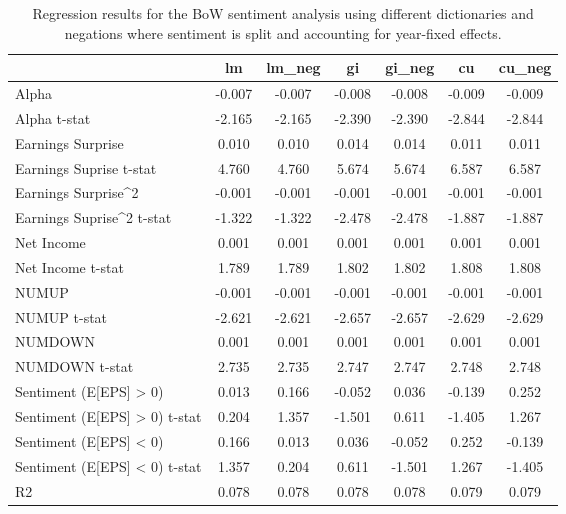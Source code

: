 \begin{table}
\caption{Regression results for the BoW sentiment analysis using different dictionaries and negations where sentiment is split and accounting for year-fixed effects.}
\label{tab:bow_regressions_split_year_fixed}
\begin{tabular}{lcccccc}
\toprule
 & lm & lm_neg & gi & gi_neg & cu & cu_neg \\
\midrule
Alpha & -0.007 & -0.007 & -0.008 & -0.008 & -0.009 & -0.009 \\
Alpha t-stat & -2.165 & -2.165 & -2.390 & -2.390 & -2.844 & -2.844 \\
Earnings Surprise & 0.010 & 0.010 & 0.014 & 0.014 & 0.011 & 0.011 \\
Earnings Suprise t-stat & 4.760 & 4.760 & 5.674 & 5.674 & 6.587 & 6.587 \\
Earnings Surprise^2 & -0.001 & -0.001 & -0.001 & -0.001 & -0.001 & -0.001 \\
Earnings Suprise^2 t-stat & -1.322 & -1.322 & -2.478 & -2.478 & -1.887 & -1.887 \\
Net Income & 0.001 & 0.001 & 0.001 & 0.001 & 0.001 & 0.001 \\
Net Income t-stat & 1.789 & 1.789 & 1.802 & 1.802 & 1.808 & 1.808 \\
NUMUP & -0.001 & -0.001 & -0.001 & -0.001 & -0.001 & -0.001 \\
NUMUP t-stat & -2.621 & -2.621 & -2.657 & -2.657 & -2.629 & -2.629 \\
NUMDOWN & 0.001 & 0.001 & 0.001 & 0.001 & 0.001 & 0.001 \\
NUMDOWN t-stat & 2.735 & 2.735 & 2.747 & 2.747 & 2.748 & 2.748 \\
Sentiment (E[EPS] > 0) & 0.013 & 0.166 & -0.052 & 0.036 & -0.139 & 0.252 \\
Sentiment (E[EPS] > 0) t-stat & 0.204 & 1.357 & -1.501 & 0.611 & -1.405 & 1.267 \\
Sentiment (E[EPS] < 0) & 0.166 & 0.013 & 0.036 & -0.052 & 0.252 & -0.139 \\
Sentiment (E[EPS] < 0) t-stat & 1.357 & 0.204 & 0.611 & -1.501 & 1.267 & -1.405 \\
R2 & 0.078 & 0.078 & 0.078 & 0.078 & 0.079 & 0.079 \\
\bottomrule
\end{tabular}
\end{table}
